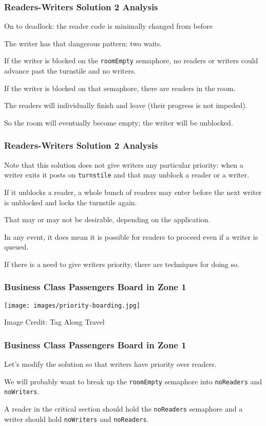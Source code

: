 \begin{frame}
	\frametitle{Readers-Writers Solution 2 Analysis}

	On to deadlock: the reader code is minimally changed from before

	The writer has that dangerous pattern: two waits.

	If the writer is blocked on the \texttt{roomEmpty} semaphore, no readers or writers could advance past the turnstile and no writers.

	If the writer is blocked on that semaphore, there are readers in the room.

	The readers will individually finish and leave (their progress is not impeded).

	So the room will eventually become empty; the writer will be unblocked.


\end{frame}

\begin{frame}
	\frametitle{Readers-Writers Solution 2 Analysis}

	Note that this solution does not give writers any particular priority: when a writer exits it posts on \texttt{turnstile} and that may unblock a reader or a writer.

	If it unblocks a reader, a whole bunch of readers may enter before the next writer is unblocked and locks the turnstile again.

	That may or may not be desirable, depending on the application.

	In any event, it does mean it is possible for readers to proceed even if a writer is queued.

	If there is a need to give writers priority, there are techniques for doing so.
\end{frame}


\begin{frame}
	\frametitle{Business Class Passengers Board in Zone 1}

	\begin{center}
		\texttt{[image: images/priority-boarding.jpg]}
	\end{center}
	\hfill Image Credit: Tag Along Travel
\end{frame}


\begin{frame}
	\frametitle{Business Class Passengers Board in Zone 1}

	Let's modify the solution so that writers have priority over readers.

	We will probably want to break up the \texttt{roomEmpty} semaphore into \texttt{noReaders} and \texttt{noWriters}.

	A reader in the critical section should hold the \texttt{noReaders} semaphore and a writer should hold \texttt{noWriters} and \texttt{noReaders}.

\end{frame}


